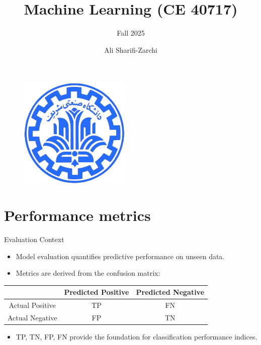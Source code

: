 \documentclass[serif, aspectratio=169]{beamer}
\author{Ali Sharifi-Zarchi}
\title{Machine Learning (CE 40717)}
\subtitle{Fall 2025}
\institute{
    CE Department \\
    Sharif University of Technology
}
\begin{document}
\begin{frame}
    \titlepage
    \vspace*{-0.6cm}
    \begin{figure}[htpb]
        \begin{center}
            \includegraphics[keepaspectratio, scale=0.1]{pic/sharif-main-logo.png}
        \end{center}
    \end{figure}
\end{frame}

\begin{frame}
\tableofcontents[sectionstyle=show,
subsectionstyle=show/shaded/hide,
subsubsectionstyle=show/shaded/hide]
\end{frame}

\section{Performance metrics}

\begin{frame}{Evaluation Context}
    \begin{itemize}
        \item Model evaluation quantifies predictive performance on unseen data.
        \item Metrics are derived from the confusion matrix:
    \end{itemize}
    \vspace{0.3cm}
    \begin{center}
    \begin{tabular}{c|cc}
        \toprule
        & Predicted Positive & Predicted Negative \\
        \midrule
        Actual Positive & TP & FN \\
        Actual Negative & FP & TN \\
        \bottomrule
    \end{tabular}
    \end{center}
    \vspace{0.3cm}
    \begin{itemize}
        \item TP, TN, FP, FN provide the foundation for classification performance indices.
    \end{itemize}
\end{frame}
\end{document}
